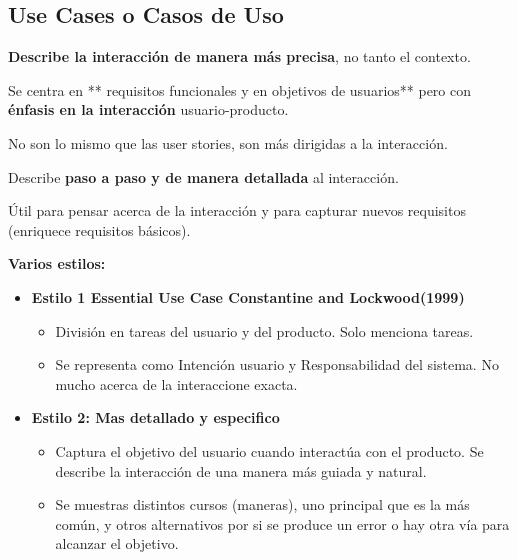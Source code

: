 \hypertarget{use-cases-o-casos-de-uso}{%
\subsection{Use Cases o Casos de Uso}\label{use-cases-o-casos-de-uso}}

\textbf{Describe la interacción de manera más precisa}, no tanto el
contexto.

Se centra en ** requisitos funcionales y en objetivos de usuarios** pero
con \textbf{énfasis en la interacción} usuario-producto.

No son lo mismo que las user stories, son más dirigidas a la
interacción.

Describe \textbf{paso a paso y de manera detallada} al interacción.

Útil para pensar acerca de la interacción y para capturar nuevos
requisitos (enriquece requisitos básicos).

\textbf{Varios estilos:}

\begin{itemize}
\tightlist
\item
  \textbf{Estilo 1 Essential Use Case Constantine and Lockwood(1999)}

  \begin{itemize}
  \tightlist
  \item
    División en tareas del usuario y del producto. Solo menciona tareas.
  \item
    Se representa como Intención usuario y Responsabilidad del sistema.
    No mucho acerca de la interaccione exacta.
  \end{itemize}
\item
  \textbf{Estilo 2: Mas detallado y especifico}

  \begin{itemize}
  \tightlist
  \item
    Captura el objetivo del usuario cuando interactúa con el producto.
    Se describe la interacción de una manera más guiada y natural.
  \item
    Se muestras distintos cursos (maneras), uno principal que es la más
    común, y otros alternativos por si se produce un error o hay otra
    vía para alcanzar el objetivo.
  \end{itemize}
\end{itemize}
